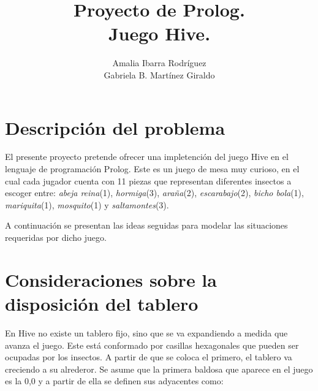 \documentclass[runningheads,a4paper]{llncs}
\begin{document}
\renewcommand{\abstractname}{Resumen.}
\renewcommand{\keywordname}{\textbf{Palabras Clave:}}
\renewcommand{\refname}{Referencias}
\renewcommand{\tablename}{Tabla}

\mainmatter  %

\title{Proyecto de Prolog.\\Juego Hive.}


\author{Amalia Ibarra Rodr\'iguez\\
	Gabriela B. Mart\'inez Giraldo}


\maketitle


\section{Descripci\'on del problema}\label{sec:ex1}

El presente proyecto pretende ofrecer una impletenci\'on del juego Hive en el lenguaje de programaci\'on Prolog. Este es un juego de mesa muy curioso, en el cual cada jugador cuenta con 11 piezas que representan diferentes insectos a escoger entre: \emph{abeja reina}(1), \emph{hormiga}(3), \emph{ara\~na}(2), \emph{escarabajo}(2), \emph{bicho bola}(1), \emph{mariquita}(1), \emph{mosquito}(1) y \emph{saltamontes}(3).

A continuaci\'on se presentan las ideas seguidas para modelar las situaciones requeridas por dicho juego.




\section{Consideraciones sobre la disposici\'on del tablero}

En Hive no existe un tablero fijo, sino que se va expandiendo a medida que avanza el juego. Este est\'a conformado por casillas hexagonales que pueden ser ocupadas por los insectos. A partir de que se coloca el primero, el tablero va creciendo  a su alrederor. Se asume que la primera baldosa que aparece en el juego es la 0,0 y a partir de ella se definen sus adyacentes como:
\end{document}
